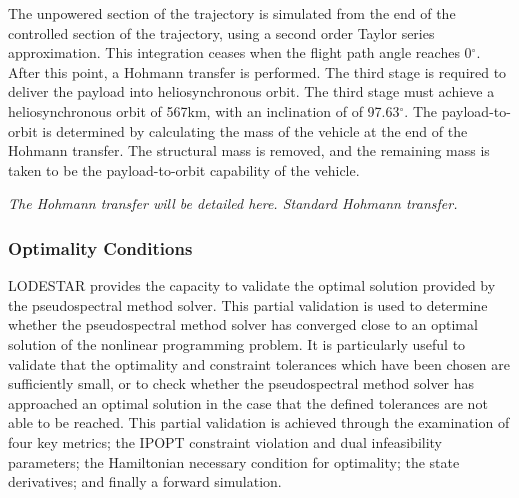 The unpowered section of the trajectory is simulated from the end of the controlled section of the trajectory, using a second order Taylor series approximation. This integration ceases when the flight path angle reaches 0$^{\circ}$. After this point, a Hohmann transfer is performed. The third stage is required to deliver the payload into heliosynchronous orbit. The third stage must achieve a heliosynchronous orbit of 567km, with an inclination of of 97.63$^\circ$.  The payload-to-orbit
is determined by calculating the mass of the vehicle at the end of the Hohmann transfer. The structural mass is removed,
and the remaining mass is taken to be the payload-to-orbit capability of the vehicle.

\textit{The Hohmann transfer will be detailed here. Standard Hohmann transfer.}




\subsubsection{Optimality Conditions}

LODESTAR provides the capacity to validate the optimal solution provided by the pseudospectral method solver. This partial validation is used to determine whether the pseudospectral method solver has converged close to an optimal solution of the nonlinear programming problem. It is particularly useful to validate that the optimality and constraint tolerances which have been chosen are sufficiently small, or to check whether the pseudospectral method solver has approached an optimal solution in the case that the defined tolerances are not able to be reached.   
This partial validation is achieved through the examination of four key metrics; the IPOPT constraint violation and dual infeasibility parameters; the Hamiltonian necessary condition for optimality; the state derivatives; and finally a forward simulation. 

